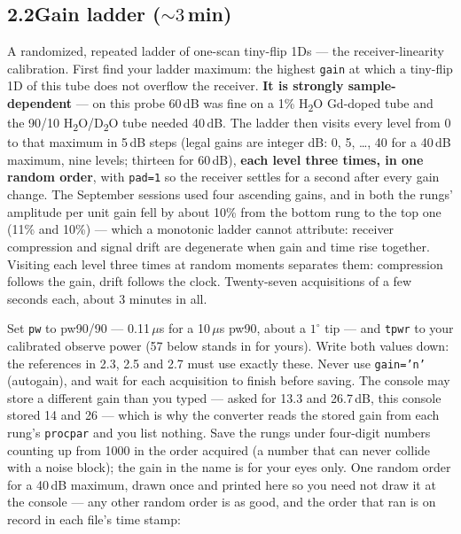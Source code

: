 \documentclass[11pt]{article}
\newcommand{\dtwo}{D\textsubscript{2}O}
\newcommand{\htwo}{H\textsubscript{2}O}
\newcommand{\file}[1]{\texttt{#1}}
\begin{document}
\subsection*{2.2\quad Gain ladder (${\sim}3$\,min)}

A randomized, repeated ladder of one-scan tiny-flip 1Ds --- the
receiver-linearity calibration. First find your ladder maximum: the
highest \texttt{gain} at which a tiny-flip 1D of this tube does not
overflow the receiver. \textbf{It is strongly sample-dependent} --- on
this probe 60\,dB was fine on a 1\% \htwo{} Gd-doped tube and the 90/10
\htwo{}/\dtwo{} tube needed 40\,dB. The ladder then visits every level
from 0 to that maximum in 5\,dB steps (legal gains are integer dB: 0,
5, \ldots, 40 for a 40\,dB maximum, nine levels; thirteen for 60\,dB),
\textbf{each level three times, in one random order}, with
\texttt{pad=1} so the receiver settles for a second after every gain
change. The September sessions used four ascending gains, and in both
the rungs' amplitude per unit gain fell by about 10\% from the bottom
rung to the top one (11\% and 10\%) --- which a monotonic ladder
cannot attribute: receiver
compression and signal drift are degenerate when gain and time rise
together. Visiting each level three times at random moments separates
them: compression follows the gain, drift follows the clock.
Twenty-seven acquisitions of a few seconds each, about 3 minutes in
all.

Set \texttt{pw} to pw90/90 --- 0.11\,$\mu$s for a 10\,$\mu$s pw90,
about a $1^{\circ}$ tip --- and \texttt{tpwr} to your calibrated
observe power (57 below stands in for yours). Write both values down:
the references in 2.3, 2.5 and 2.7 must use exactly these. Never use
\texttt{gain='n'} (autogain), and wait for each acquisition to finish
before saving. The console may store a different gain than you typed
--- asked for 13.3 and 26.7\,dB, this console stored 14 and 26 ---
which is why the converter reads the stored gain from each rung's
\file{procpar} and you list nothing. Save the rungs under four-digit
numbers counting up from 1000 in the order acquired (a number that can
never collide with a noise block); the gain in the name is for your
eyes only. One random order for a 40\,dB maximum, drawn once and
printed here so you need not draw it at the console --- any other
random order is as good, and the order that ran is on record in each
file's time stamp:
\end{document}
